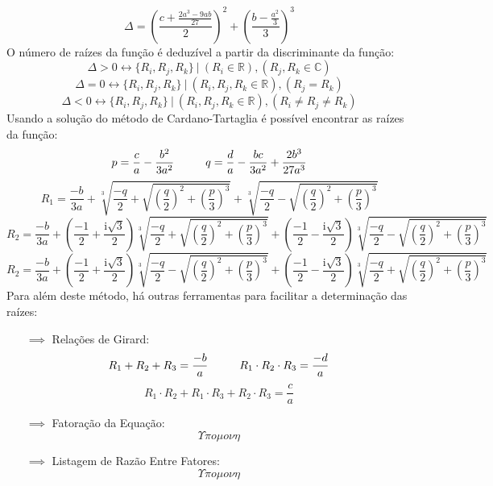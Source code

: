 \begin{description}
                \[ \Delta = \left(\frac{ c + \frac{2a^3 - 9ab}{27}}{2}\right)^2 + \left(\frac{ b - \frac{a^2}{3}}{3}\right)^3 \]
                O número de raízes da função é deduzível a partir da discriminante da função:
                \[ \Delta > 0 \leftrightarrow \{ R_i, R_j, R_k \} \ | \ (R_i \in \mathbb{R}), (R_j, R_k \in \mathbb{C}) \]
                \[ \Delta = 0 \leftrightarrow \{ R_i, R_j, R_k \} \ | \ (R_i, R_j, R_k \in \mathbb{R}), (R_j = R_k) \]
                \[ \Delta < 0 \leftrightarrow \{ R_i, R_j, R_k \} \ | \ (R_i, R_j, R_k \in \mathbb{R}), (R_i \neq R_j \neq R_k) \]
                Usando a solução do método de Cardano-Tartaglia é possível encontrar as raízes da função:
                \[ p = \frac{c}{a} - \frac{b^2}{3a^2} \hphantom{---} q = \frac{d}{a} - \frac{bc}{3a^2} + \frac{2b^3}{27a^3}\]
                \[ R_1 = \frac{-b}{3a} + \sqrt[3]{\frac{-q}{2} + \sqrt{\left(\frac{q}{2} \right)^2 + \left(\frac{p}{3} \right)^3}} + \sqrt[3]{\frac{-q}{2} - \sqrt{{\left(\frac{q}{2} \right)^2 + \left(\frac{p}{3} \right)^3}}} \]
                \[ R_2 = \frac{-b}{3a} + \left( \frac{-1}{2} + \frac{\mathrm{i\sqrt{3}}}{2} \right) \sqrt[3]{\frac{-q}{2} + \sqrt{{\left(\frac{q}{2} \right)^2 + \left(\frac{p}{3} \right)^3}}} + \left( \frac{-1}{2} - \frac{\mathrm{i\sqrt{3}}}{2} \right) \sqrt[3]{\frac{-q}{2} - \sqrt{{\left(\frac{q}{2} \right)^2 + \left(\frac{p}{3} \right)^3}}} \]
                \[ R_2 = \frac{-b}{3a} + \left( \frac{-1}{2} + \frac{\mathrm{i\sqrt{3}}}{2} \right) \sqrt[3]{\frac{-q}{2} - \sqrt{{\left(\frac{q}{2} \right)^2 + \left(\frac{p}{3} \right)^3}}} + \left( \frac{-1}{2} - \frac{\mathrm{i\sqrt{3}}}{2} \right) \sqrt[3]{\frac{-q}{2} + \sqrt{{\left(\frac{q}{2} \right)^2 + \left(\frac{p}{3} \right)^3}}} \]
                Para além deste método, há outras ferramentas para facilitar a determinação das raízes:
                \begin{itemize}
                    \item[$\implies$] Relações de Girard:
                    \[ R_1 + R_2 + R_3 = \frac{-b}{a} \hphantom{---} R_1 \cdot R_2 \cdot R_3 = \frac{-d}{a}\]
                    \[ R_1 \cdot R_2 + R_1 \cdot R_3 + R_2 \cdot R_3 = \frac{c}{a} \]
                    \item[$\implies$] Fatoração da Equação: \[ \Upsilon \pi o \mu o \nu \eta \]
                    \item[$\implies$] Listagem de Razão Entre Fatores: \[ \Upsilon \pi o \mu o \nu \eta \]
                \end{itemize}
        \end{description}
